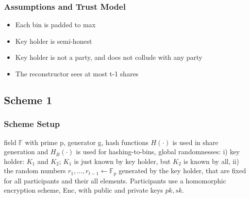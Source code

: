 \subsubsection{Assumptions and Trust Model}
\begin{itemize}
    \item Each bin is padded to max
    \item Key holder is semi-honest
    \item Key holder is not a party, and does not collude with any party
    \item The reconstructor sees at most t-1 shares
\end{itemize}
\subsection{Scheme 1}
\subsubsection{Scheme Setup}
field $\mathbb{F}$ with prime p, generator g, hash functions $H(\cdot)$ is used in share generation and $H_B(\cdot)$ is used for hashing-to-bins, global randomnesses: i) key holder: $K_1$ and $K_2$; $K_1$ is just known by key holder, but $K_2$ is known by all, ii) the random numbers $r_1, \dots, r_{t-1} \gets \mathbb{F}_p$ generated by the key holder, that are fixed for all participants and their all elements. Participants use a homomorphic encryption scheme, Enc, with public and private keys $pk, sk$.
